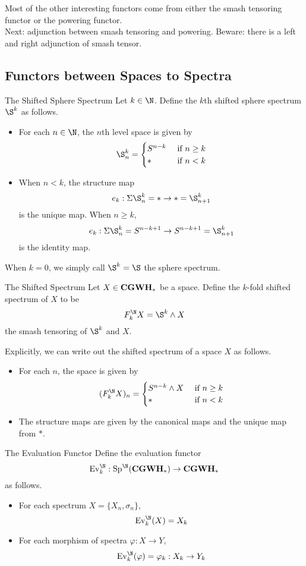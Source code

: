 \documentclass[a4paper]{article}
\begin{document}
Most of the other interesting functors come from either the smash tensoring functor or the powering functor. \\

Next: adjunction between smash tensoring and powering. Beware: there is a left and right adjunction of smash tensor. 

\subsection{Functors between Spaces to Spectra}
\begin{defn}{The Shifted Sphere Spectrum}{} Let $k\in\N$. Define the $k$th shifted sphere spectrum $\S^k$ as follows. 
\begin{itemize}
\item For each $n\in\N$, the $n$th level space is given by $$\S_n^k=\begin{cases}
S^{n-k} & \text{ if }n\geq k\\
\ast & \text{ if }n<k
\end{cases}$$
\item When $n<k$, the structure map $$e_k:\Sigma\S_n^k=\ast\to\ast=\S_{n+1}^k$$ is the unique map. When $n\geq k$, $$e_k:\Sigma\S_n^k=S^{n-k+1}\to S^{n-k+1}=\S_{n+1}^k$$ is the identity map. 
\end{itemize}
\end{defn}

When $k=0$, we simply call $\S^k=\S$ the sphere spectrum. 

\begin{defn}{The Shifted Spectrum}{} Let $X\in\bold{CGWH}_\ast$ be a space. Define the $k$-fold shifted spectrum of $X$ to be $$F_k^\N X=\S^k\wedge X$$ the smash tensoring of $\S^k$ and $X$. 
\end{defn}
Explicitly, we can write out the shifted spectrum of a space $X$ as follows. 
\begin{itemize}
\item For each $n$, the space is given by $$(F_k^\N X)_n=\begin{cases}
S^{n-k}\wedge X & \text{ if } n\geq k\\
\ast & \text{ if } n<k
\end{cases}$$
\item The structure maps are given by the canonical maps and the unique map from $\ast$. 
\end{itemize}

\begin{defn}{The Evaluation Functor}{} Define the evaluation functor $$\text{Ev}_k^\N:\text{Sp}^\N(\bold{CGWH}_\ast)\to\bold{CGWH}_\ast$$ as follows. 
\begin{itemize}
\item For each spectrum $X=\{X_n,\sigma_n\}$, $$\text{Ev}_k^\N(X)=X_k$$
\item For each morphism of spectra $\varphi:X\to Y$, $$\text{Ev}_k^\N(\varphi)=\varphi_k:X_k\to Y_k$$
\end{itemize}
\end{defn}
\end{document}
